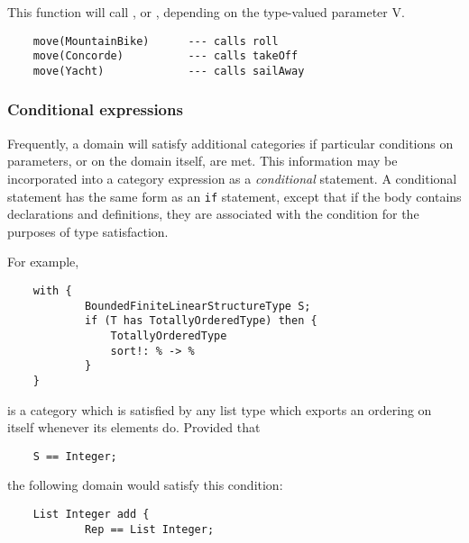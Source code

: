 {This function will call ,  or ,
depending on the type-valued parameter V. 

\begin{small}
\begin{verbatim}
    move(MountainBike)      --- calls roll
    move(Concorde)          --- calls takeOff
    move(Yacht)             --- calls sailAway
\end{verbatim}
\end{small}

\subsubsection{Conditional expressions}
\label{asugLangCondExpr}

Frequently, a domain will satisfy additional categories if particular
conditions on parameters, or on the domain itself, are met. This
information may be incorporated into a category expression as a
{\em conditional} statement. A conditional statement has the same form
as an {\tt if} statement, except that if the body contains declarations
and definitions, they are associated with the condition for the purposes
of type satisfaction.

For example,

\begin{small}
\begin{verbatim}
    with {
            BoundedFiniteLinearStructureType S;
            if (T has TotallyOrderedType) then {
                TotallyOrderedType
                sort!: % -> %
            }
    }
\end{verbatim}
\end{small}

is a category which is satisfied by any list type which exports an
ordering on itself whenever its elements do.  Provided that 

\begin{small}
\begin{verbatim}
    S == Integer;
\end{verbatim}
\end{small}

the following domain would satisfy this condition:

\begin{small}
\begin{verbatim}
    List Integer add {
            Rep == List Integer;


\end{verbatim}
\end{small}}
